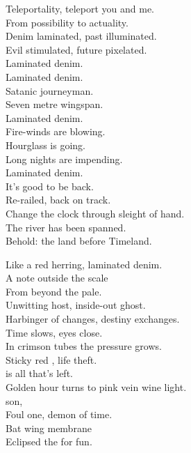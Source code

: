 Teleportality, teleport you and me. \\
From possibility to actuality. \\
Denim laminated, past illuminated. \\
Evil stimulated, future pixelated. \\

Laminated denim. \\

Laminated denim. \\
Satanic journeyman. \\
Seven metre wingspan. \\
Laminated denim. \\
Fire-winds are blowing. \\
Hourglass is going. \\
Long nights are impending. \\
Laminated denim. \\

It's good to be back. \\
Re-railed, back on track. \\
Change the clock through sleight of hand. \\
The river has been spanned. \\
Behold: the land before Timeland. \\





Like a red herring, laminated denim. \\
A note outside the scale \\
From beyond the pale. \\
Unwitting host, inside-out ghost. \\
Harbinger of changes, destiny exchanges. \\

Time slows, eyes close. \\
In crimson tubes the pressure grows. \\
Sticky red , life theft. \\
 is all that's left. \\

Golden hour turns to pink vein wine light. \\
 son, \\
Foul one, demon of time. \\
Bat wing membrane \\
Eclipsed the  for fun. \\

